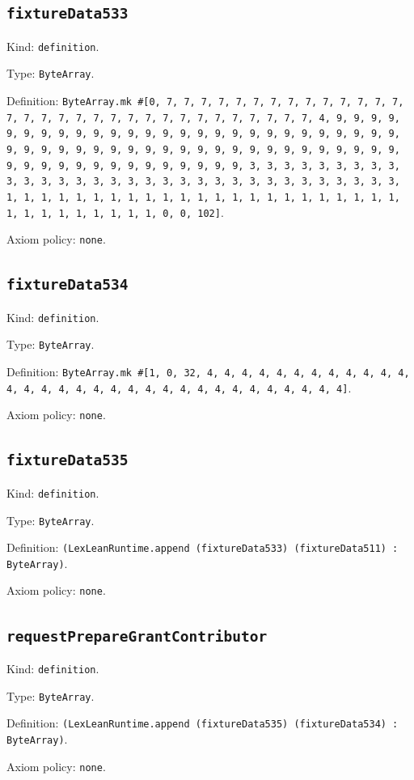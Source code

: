 \documentclass[11pt]{article}
\begin{document}
\subsection*{\texttt{fixtureData533}}
\noindent Kind: \texttt{definition}.\par
\noindent Type: \texttt{ByteArray}.\par
\noindent Definition: \texttt{ByteArray.mk \#[0, 7, 7, 7, 7, 7, 7, 7, 7, 7, 7, 7, 7, 7, 7, 7, 7, 7, 7, 7, 7, 7, 7, 7, 7, 7, 7, 7, 7, 7, 7, 7, 7, 4, 9, 9, 9, 9, 9, 9, 9, 9, 9, 9, 9, 9, 9, 9, 9, 9, 9, 9, 9, 9, 9, 9, 9, 9, 9, 9, 9, 9, 9, 9, 9, 9, 9, 9, 9, 9, 9, 9, 9, 9, 9, 9, 9, 9, 9, 9, 9, 9, 9, 9, 9, 9, 9, 9, 9, 9, 9, 9, 9, 9, 9, 9, 9, 9, 3, 3, 3, 3, 3, 3, 3, 3, 3, 3, 3, 3, 3, 3, 3, 3, 3, 3, 3, 3, 3, 3, 3, 3, 3, 3, 3, 3, 3, 3, 3, 3, 1, 1, 1, 1, 1, 1, 1, 1, 1, 1, 1, 1, 1, 1, 1, 1, 1, 1, 1, 1, 1, 1, 1, 1, 1, 1, 1, 1, 1, 1, 1, 1, 0, 0, 102]}.\par
\noindent Axiom policy: \texttt{none}.\par
\subsection*{\texttt{fixtureData534}}
\noindent Kind: \texttt{definition}.\par
\noindent Type: \texttt{ByteArray}.\par
\noindent Definition: \texttt{ByteArray.mk \#[1, 0, 32, 4, 4, 4, 4, 4, 4, 4, 4, 4, 4, 4, 4, 4, 4, 4, 4, 4, 4, 4, 4, 4, 4, 4, 4, 4, 4, 4, 4, 4, 4, 4, 4]}.\par
\noindent Axiom policy: \texttt{none}.\par
\subsection*{\texttt{fixtureData535}}
\noindent Kind: \texttt{definition}.\par
\noindent Type: \texttt{ByteArray}.\par
\noindent Definition: \texttt{(LexLeanRuntime.append (fixtureData533) (fixtureData511) : ByteArray)}.\par
\noindent Axiom policy: \texttt{none}.\par
\subsection*{\texttt{requestPrepareGrantContributor}}
\noindent Kind: \texttt{definition}.\par
\noindent Type: \texttt{ByteArray}.\par
\noindent Definition: \texttt{(LexLeanRuntime.append (fixtureData535) (fixtureData534) : ByteArray)}.\par
\noindent Axiom policy: \texttt{none}.\par
\end{document}
